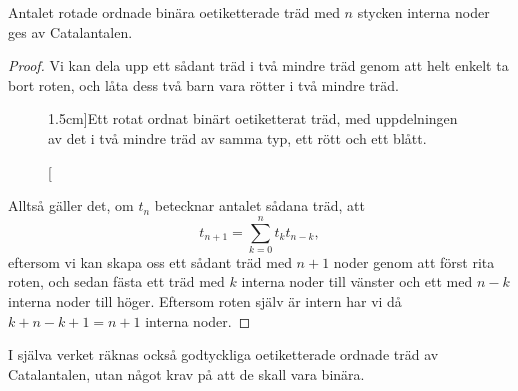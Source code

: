 \documentclass[nobib]{tufte-handout}
\begin{document}
\begin{proposition}
    Antalet rotade ordnade binära oetiketterade träd med $n$ stycken interna noder ges av Catalantalen.

    \begin{proof}
        Vi kan dela upp ett sådant träd i två mindre träd genom att helt enkelt ta bort roten, och låta dess två barn vara rötter i två mindre träd.

        \begin{figure}
            \centering        
            
            \caption[][1.5cm]{Ett rotat ordnat binärt oetiketterat träd, med uppdelningen av det i två mindre träd av samma typ, ett rött och ett blått.}
        \end{figure}

        Alltså gäller det, om $t_n$ betecknar antalet sådana träd, att
        $$t_{n+1} = \sum_{k=0}^{n} t_k t_{n-k},$$
        eftersom vi kan skapa oss ett sådant träd med $n+1$ noder genom att först rita roten, och sedan fästa ett träd med $k$ interna noder till vänster och ett med $n-k$ interna noder till höger. Eftersom roten själv är intern har vi då $k + n - k + 1 = n + 1$ interna noder.
    \end{proof}
\end{proposition}

I själva verket räknas också godtyckliga oetiketterade ordnade träd av Catalantalen, utan något krav på att de skall vara binära.
\end{document}
